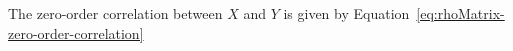 \noindent The zero-order correlation between
$
X
$
and
$
Y
$
is given by
Equation~\eqref{eq:rhoMatrix-zero-order-correlation}
